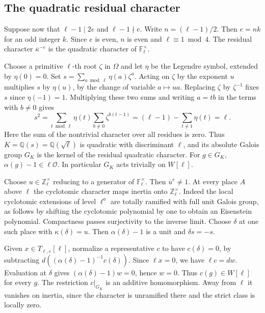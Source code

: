 \subsection{The quadratic residual character}

Suppose now that \(\ell-1\mid 2e\) and \(\ell-1\nmid e\).
Write \(n=(\ell-1)/2\). Then \(e=nk\) for an odd integer \(k\).
Since \(e\) is even, \(n\) is even and \(\ell\equiv1\bmod4\).
The residual character \(\overline\kappa^{-e}\) is the quadratic
character of \(\mathbb F_\ell^\times\).

Choose a primitive \(\ell\)-th root \(\zeta\) in \(\Omega\) and let
\(\eta\) be the Legendre symbol, extended by \(\eta(0)=0\).
Set \(s=\sum_{a\bmod\ell}\eta(a)\zeta^a\). Acting on \(\zeta\) by
the exponent \(u\) multiplies \(s\) by \(\eta(u)\), by the change of
variable \(a\mapsto ua\). Replacing \(\zeta\) by \(\zeta^{-1}\)
fixes \(s\) since \(\eta(-1)=1\). Multiplying these two sums and
writing \(a=tb\) in the terms with \(b\ne0\) gives
\[
 s^2
   =\sum_{t\bmod\ell}\eta(t)\sum_{b\ne0}\zeta^{b(t-1)}
   =(\ell-1)-\sum_{t\ne1}\eta(t)=\ell .
\]
Here the sum of the nontrivial character over all residues is zero.
Thus \(K=\mathbb Q(s)=\mathbb Q(\sqrt\ell)\) is quadratic with
discriminant \(\ell\), and its absolute Galois group \(G_K\) is the
kernel of the residual quadratic character. For \(g\in G_K\),
\(\alpha(g)-1\in\ell\mathcal O\). In particular \(G_K\) acts
trivially on \(W[\ell]\).

Choose \(u\in\mathbb Z_\ell^\times\) reducing to a generator of
\(\mathbb F_\ell^\times\). Then \(\overline u^e\ne1\).
At every place \(A\) above \(\ell\) the cyclotomic character maps
inertia onto \(\mathbb Z_\ell^\times\). Indeed the local cyclotomic
extensions of level \(\ell^a\) are totally ramified with full unit
Galois group, as follows by shifting the cyclotomic polynomial by
one to obtain an Eisenstein polynomial. Compactness passes surjectivity
to the inverse limit. Choose \(\delta\) at one such place with
\(\kappa(\delta)=u\). Then \(\alpha(\delta)-1\) is a unit and
\(\delta s=-s\).

Given \(x\in T_{\ell,e}[\ell]\), normalize a representative \(c\)
to have \(c(\delta)=0\), by subtracting
\(d((\alpha(\delta)-1)^{-1}c(\delta))\). Since \(\ell x=0\),
we have \(\ell c=dw\). Evaluation at \(\delta\) gives
\((\alpha(\delta)-1)w=0\), hence \(w=0\). Thus \(c(g)\in W[\ell]\)
for every \(g\). The restriction \(c|_{G_K}\) is an additive
homomorphism. Away from \(\ell\) it vanishes on inertia, since the
character is unramified there and the strict class is locally zero.

